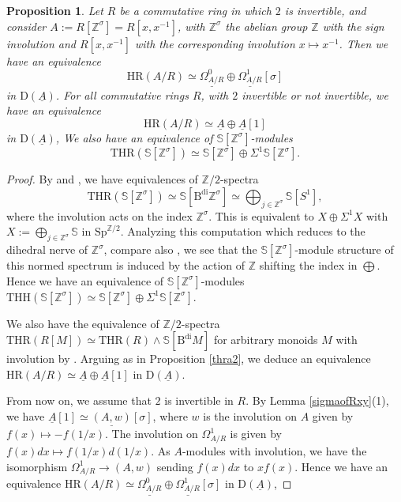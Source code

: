 \documentclass[10pt]{amsart}
\newtheorem{prop}[thm]{Proposition}
\theoremstyle{definition}
\numberwithin{equation}{section}
\newcommand{\Sphere}{\mathbb{S}}
\newcommand{\Z}{\mathbb{Z}}
\newcommand{\rD}{\mathrm{D}}
\newcommand{\ul}{\underline}
\newcommand{\Sp}{\mathrm{Sp}}
\newcommand{\HR}{\mathrm{HR}}
\newcommand{\THH}{\mathrm{THH}}
\newcommand{\THR}{\mathrm{THR}}
\newcommand{\Bdi}{\mathrm{B}^\mathrm{di}}
\begin{document}
\begin{prop}
\label{HRsigma}
Let $R$ be a commutative ring in which $2$ is invertible, and consider $A:=R[\Z^\sigma]=R[x,x^{-1}]$,
with $\Z^\sigma$ the abelian group $\Z$ with the sign involution and $R[x,x^{-1}]$ with the corresponding involution $x \mapsto x^{-1}$.
Then we have an equivalence
$$\HR(A/R)
\simeq  \ul{\Omega_{A/R}^0} \oplus \ul{\Omega_{A/R}^1}[\sigma]$$
in $\rD(\ul{A})$.
For all commutative rings $R$,
with $2$ invertible or not invertible,
we have an equivalence
\[
\HR(A/R)
\simeq  \ul{A} \oplus  \ul{A}[1]
\]
in $\rD(\ul{A})$,
We also have an equivalence of $\Sphere[\Z^\sigma]$-modules
\[
\THR(\Sphere[\Z^\sigma])
\simeq
\Sphere[\Z^\sigma] \oplus \Sigma^1\Sphere[\Z^\sigma].
\]
\end{prop}
\begin{proof}
By \cite[Proposition 5.9]{DMPR21} and \cite[(4.13)]{HP23},
we have equivalences of $\Z/2$-spectra
\[
\THR(\Sphere[\Z^{\sigma}])
\simeq
\Sphere[\Bdi \Z^\sigma]
\simeq \bigoplus_{j\in \Z^\sigma} \Sphere[S^1],
\]
where the involution acts on the index $\Z^\sigma$.
This is equivalent to $X\oplus \Sigma^1 X$ with $X:=\bigoplus_{j\in \Z^\sigma} \Sphere$ in $\Sp^{\Z/2}$.
Analyzing this computation which reduces to the dihedral nerve of $\Z^\sigma$, compare also \cite[Proposition 4.2.6]{HP23}, we see that the $\Sphere[\Z^\sigma]$-module structure of this normed spectrum is induced by the action of $\Z$ shifting the index in $\bigoplus$.
Hence we have an equivalence of $\Sphere[\Z^\sigma]$-modules $\THH(\Sphere[\Z^\sigma])\simeq \Sphere[\Z^\sigma]\oplus \Sigma^1\Sphere[\Z^\sigma]$.

We also have the equivalence of $\Z/2$-spectra $\THR(R[M]) \simeq \THR(R) \wedge \Sphere [\Bdi M]$ for arbitrary monoids $M$ with involution by \cite[Proposition 4.2.15]{HP23}.
Arguing as in Proposition \ref{thra2}, we deduce
an equivalence
\(
\HR(A/R)
\simeq  \ul{A} \oplus  \ul{A}[1]
\)
in $\rD(\ul{A})$.

From now on,
we assume that $2$ is invertible in $R$.
By Lemma \ref{sigmaofRxy}(1),
we have $\ul{A}[1]\simeq \ul{(A,w)}[\sigma]$, where $w$ is the involution on $A$ given by $f(x)\mapsto -f(1/x)$.
The involution on $\Omega_{A/R}^1$ is given by $f(x)dx\mapsto f(1/x)d(1/x)$.
As $A$-modules with involution,
we have the isomorphism $\Omega_{A/R}^1\to (A,w)$ sending $f(x)dx$ to $xf(x)$.
Hence we have an equivalence
\(
\HR(A/R)
\simeq  \ul{\Omega_{A/R}^0} \oplus \ul{\Omega_{A/R}^1} [\sigma]\)
in $\rD(\ul{A})$,
\end{proof}
\end{document}
